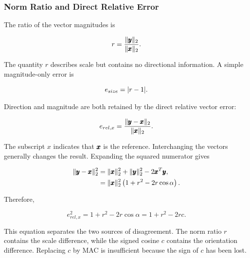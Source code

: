 \subsubsection{Norm Ratio and Direct Relative Error}

The ratio of the vector magnitudes is

\begin{equation}\label{vector-norm-ratio}
    r=\frac{\| {\pmb{y}} \|_2}{\| {\pmb{x}} \|_2}.
\end{equation}

The quantity $r$ describes scale but contains no directional information. A
simple magnitude-only error is

\begin{equation}
    e_{size}=| {r-1} |.
\end{equation}

Direction and magnitude are both retained by the direct relative vector error:

\begin{bbox}
    \begin{equation}\label{direct-relative-vector-error}
        e_{rel,x}
        =
        \frac{\| {\pmb{y}-\pmb{x}} \|_2}{\| {\pmb{x}} \|_2}.
    \end{equation}
\end{bbox}

The subscript $x$ indicates that $\pmb{x}$ is the reference. Interchanging the
vectors generally changes the result. Expanding the squared numerator gives

\begin{align}
    \| {\pmb{y}-\pmb{x}} \|_2^2
    &=
    \| {\pmb{x}} \|_2^2+\| {\pmb{y}} \|_2^2
    -2\pmb{x}^{T}\pmb{y},\\
    &=
    \| {\pmb{x}} \|_2^2
    \left(1+r^2-2r\cos\alpha\right).
\end{align}

Therefore,

\begin{bbox}
    \begin{equation}\label{relative-error-angle-scale-relation}
        e_{rel,x}^{2}
        =1+r^2-2r\cos\alpha
        =1+r^2-2r c.
    \end{equation}
\end{bbox}

This equation separates the two sources of disagreement. The norm ratio $r$
contains the scale difference, while the signed cosine $c$ contains the
orientation difference. Replacing $c$ by MAC is insufficient because the sign
of $c$ has been lost.

